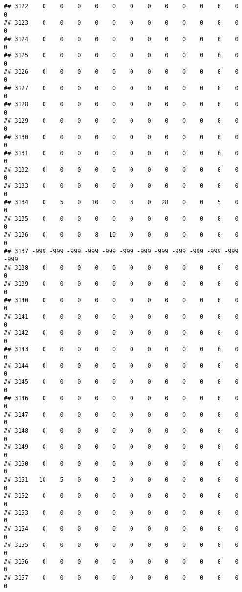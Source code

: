 \documentclass[]{article}
\begin{document}
\begin{verbatim}
## 3122    0    0    0    0    0    0    0    0    0    0    0    0    0
## 3123    0    0    0    0    0    0    0    0    0    0    0    0    0
## 3124    0    0    0    0    0    0    0    0    0    0    0    0    0
## 3125    0    0    0    0    0    0    0    0    0    0    0    0    0
## 3126    0    0    0    0    0    0    0    0    0    0    0    0    0
## 3127    0    0    0    0    0    0    0    0    0    0    0    0    0
## 3128    0    0    0    0    0    0    0    0    0    0    0    0    0
## 3129    0    0    0    0    0    0    0    0    0    0    0    0    0
## 3130    0    0    0    0    0    0    0    0    0    0    0    0    0
## 3131    0    0    0    0    0    0    0    0    0    0    0    0    0
## 3132    0    0    0    0    0    0    0    0    0    0    0    0    0
## 3133    0    0    0    0    0    0    0    0    0    0    0    0    0
## 3134    0    5    0   10    0    3    0   28    0    0    5    0    0
## 3135    0    0    0    0    0    0    0    0    0    0    0    0    0
## 3136    0    0    0    8   10    0    0    0    0    0    0    0    0
## 3137 -999 -999 -999 -999 -999 -999 -999 -999 -999 -999 -999 -999 -999
## 3138    0    0    0    0    0    0    0    0    0    0    0    0    0
## 3139    0    0    0    0    0    0    0    0    0    0    0    0    0
## 3140    0    0    0    0    0    0    0    0    0    0    0    0    0
## 3141    0    0    0    0    0    0    0    0    0    0    0    0    0
## 3142    0    0    0    0    0    0    0    0    0    0    0    0    0
## 3143    0    0    0    0    0    0    0    0    0    0    0    0    0
## 3144    0    0    0    0    0    0    0    0    0    0    0    0    0
## 3145    0    0    0    0    0    0    0    0    0    0    0    0    0
## 3146    0    0    0    0    0    0    0    0    0    0    0    0    0
## 3147    0    0    0    0    0    0    0    0    0    0    0    0    0
## 3148    0    0    0    0    0    0    0    0    0    0    0    0    0
## 3149    0    0    0    0    0    0    0    0    0    0    0    0    0
## 3150    0    0    0    0    0    0    0    0    0    0    0    0    0
## 3151   10    5    0    0    3    0    0    0    0    0    0    0    0
## 3152    0    0    0    0    0    0    0    0    0    0    0    0    0
## 3153    0    0    0    0    0    0    0    0    0    0    0    0    0
## 3154    0    0    0    0    0    0    0    0    0    0    0    0    0
## 3155    0    0    0    0    0    0    0    0    0    0    0    0    0
## 3156    0    0    0    0    0    0    0    0    0    0    0    0    0
## 3157    0    0    0    0    0    0    0    0    0    0    0    0    0

\end{verbatim}
\end{document}
